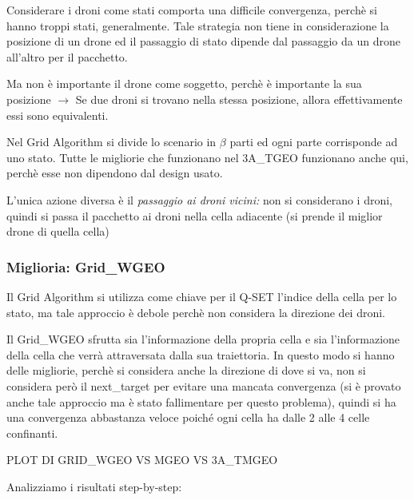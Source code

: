 \documentclass[12pt]{article}
\begin{document}
Considerare i droni come stati comporta una difficile convergenza, perchè si hanno troppi stati, generalmente. Tale strategia non tiene in considerazione la posizione di un drone ed il passaggio di stato dipende dal passaggio da un drone all'altro per il pacchetto.

Ma non è importante il drone come soggetto, perchè è importante la sua posizione $\rightarrow$ Se due droni si trovano nella stessa posizione, allora effettivamente essi sono equivalenti.

Nel Grid Algorithm si divide lo scenario in $\beta$ parti ed ogni parte corrisponde ad uno stato. Tutte le migliorie che funzionano nel 3A\_TGEO funzionano anche qui, perchè esse non dipendono dal design usato.

L'unica azione diversa è il \textit{passaggio ai droni vicini:} non si considerano i droni, quindi si passa il pacchetto ai droni nella cella adiacente (si prende il miglior drone di quella cella)


\subsubsection{Miglioria: Grid\_WGEO}

Il Grid Algorithm si utilizza come chiave per il Q-SET l'indice della cella per lo stato, ma tale approccio è debole perchè non considera la direzione dei droni.

Il Grid\_WGEO sfrutta sia l'informazione della propria cella e sia l'informazione della cella che verrà attraversata dalla sua traiettoria. In questo modo si hanno delle migliorie, perchè si considera anche la direzione di dove si va, non si considera però il next\_target per evitare una mancata convergenza (si è provato anche tale approccio ma è stato fallimentare per questo problema), quindi si ha una convergenza abbastanza veloce poiché ogni cella ha dalle 2 alle 4 celle confinanti.

PLOT DI GRID\_WGEO VS MGEO VS 3A\_TMGEO


Analizziamo i risultati step-by-step:
\end{document}
